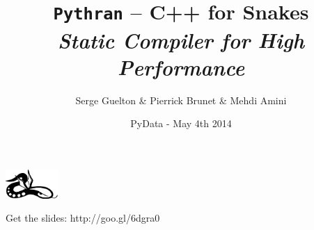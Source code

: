\documentclass[aspectratio=1610]{beamer}
\author[Serge Guelton, Pierrick Brunet, Mehdi Amini]{Serge Guelton \& Pierrick Brunet \& Mehdi Amini}
\title[\texttt{pythran}]{\texttt{Pythran} -- C++ for Snakes\\\emph{\small Static Compiler for High Performance}}
\date{PyData - May 4th 2014}
\institute{}
\begin{document}
\begin{frame}
  \maketitle

  \begin{center}
    \includegraphics[height=3em]{logo}
  \end{center}
  \vfill
  \hfill
  \scriptsize{Get the slides: http://goo.gl/6dgra0}
\end{frame}

% 
% 
\end{document}
